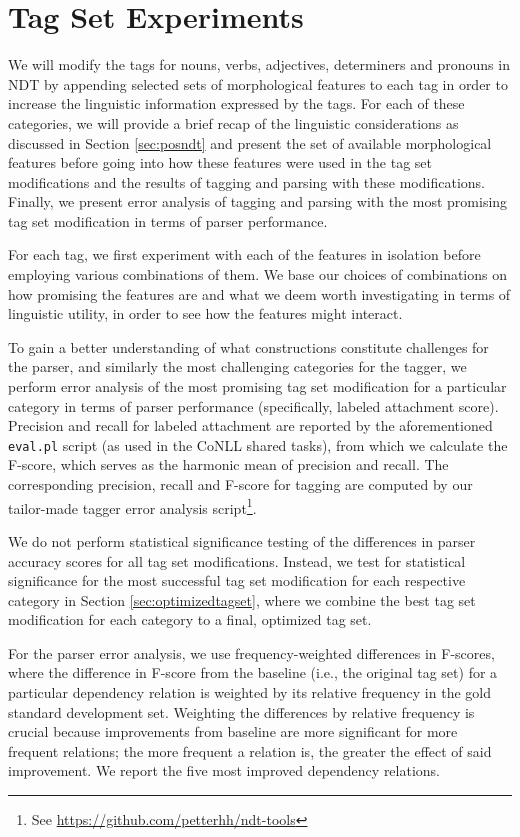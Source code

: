 \documentclass[a4paper,12pt,english]{book}
\begin{document}
\section{Tag Set Experiments}
\label{sec:tagsetexperiments}
We will modify the tags for nouns, verbs, adjectives, determiners and pronouns
in NDT by appending selected sets of morphological features to each tag in
order to increase the linguistic information expressed by the tags. For each of
these categories, we will provide a brief recap of the linguistic
considerations as discussed in Section \ref{sec:posndt} and present the set of
available morphological features before going into how these features were used
in the tag set modifications and the results of tagging and parsing with these
modifications. Finally, we present error analysis of tagging and parsing with
the most promising tag set modification in terms of parser performance.

For each tag, we first experiment with each of the features in isolation before
employing various combinations of them. We base our choices of combinations on
how promising the features are and what we deem worth investigating in terms of
linguistic utility, in order to see how the features might interact.

To gain a better understanding of what constructions constitute challenges for
the parser, and similarly the most challenging categories for the tagger, we
perform error analysis of the most promising tag set modification for a
particular category in terms of parser performance (specifically, labeled
attachment score). Precision and recall for labeled attachment are reported by
the aforementioned \texttt{eval.pl} script (as used in the CoNLL shared tasks),
from which we calculate the F-score, which serves as the harmonic mean of
precision and recall. The corresponding precision, recall and F-score for
tagging are computed by our tailor-made tagger error analysis
script\footnote{See \url{https://github.com/petterhh/ndt-tools}}.

We do not perform statistical significance testing of the differences in parser
accuracy scores for all tag set modifications. Instead, we test for statistical
significance for the most successful tag set modification for each respective
category in Section \ref{sec:optimizedtagset}, where we combine the best tag
set modification for each category to a final, optimized tag set.

For the parser error analysis, we use frequency-weighted differences in
F-scores, where the difference in F-score from the baseline (i.e., the original
tag set) for a particular dependency relation is weighted by its relative
frequency in the gold standard development set. Weighting the differences by
relative frequency is crucial because improvements from baseline are more
significant for more frequent relations; the more frequent a relation is, the
greater the effect of said improvement. We report the five most improved
dependency relations.
\end{document}
